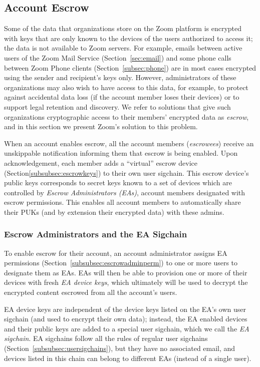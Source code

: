 \subsection{Account Escrow}
\label{subsec:keyescrow}

Some of the data that organizations store on the Zoom platform is encrypted with keys that are only
known to the devices of the users authorized to access it; the data is not available to Zoom
servers. For example, emails between active users of the Zoom Mail Service (Section~\ref{sec:email})
and some phone calls between Zoom Phone clients (Section~\ref{subsec:phone}) are in most cases
encrypted using the sender and recipient's keys only. However, administrators of these organizations
may also wish to have access to this data, for example, to protect against accidental data loss (if
the account member loses their devices) or to support legal retention and discovery. We refer to
solutions that give such organizations cryptographic access to their members' encrypted data as
\textit{escrow}, and in this section we present Zoom's solution to this problem.

When an account enables escrow, all the account members (\emph{escrowees}) receive an unskippable
notification informing them that escrow is being enabled. Upon acknowledgement, each member adds a
``virtual'' escrow device (Section\ref{subsubsec:escrowkeys}) to their own user sigchain. This
escrow device's public keys corresponds to secret keys known to a set of devices which are
controlled by \emph{Escrow Administrators (EAs)}, account members designated with escrow
permissions. This enables all account members to automatically share their PUKs (and by extension
their encrypted data) with these admins.

\subsubsection{Escrow Administrators and the EA Sigchain}
\label{subsubsec:escrowadmins}

To enable escrow for their account, an account administrator assigns EA permissions
(Section~\ref{subsubsec:escrowadminperm}) to one or more users to designate them as EAs. EAs will
then be able to provision one or more of their devices with fresh \emph{EA device keys}, which
ultimately will be used to decrypt the encrypted content escrowed from all the account's users.

EA device keys are independent of the device keys listed on the EA's own user sigchain (and used to
encrypt their own data); instead, the EA enabled devices and their public keys are added to a
special user sigchain, which we call the \emph{EA sigchain}. EA sigchains follow all the rules of
regular user sigchains (Section~\ref{subsubsec:usersigchains}), but they have no associated email,
and devices listed in this chain can belong to different EAs (instead of a single user).

